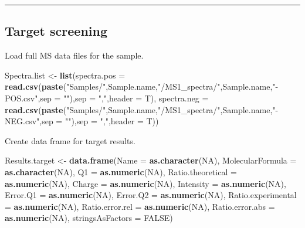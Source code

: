 \documentclass[]{article}
\newenvironment{Shaded}{\begin{snugshade}}{\end{snugshade}}
\newcommand{\KeywordTok}[1]{\textcolor[rgb]{0.13,0.29,0.53}{\textbf{#1}}}
\newcommand{\DataTypeTok}[1]{\textcolor[rgb]{0.13,0.29,0.53}{#1}}
\newcommand{\StringTok}[1]{\textcolor[rgb]{0.31,0.60,0.02}{#1}}
\newcommand{\OtherTok}[1]{\textcolor[rgb]{0.56,0.35,0.01}{#1}}
\newcommand{\NormalTok}[1]{#1}
\begin{document}
\begin{center}\rule{0.5\linewidth}{\linethickness}\end{center}

\subsection{Target screening}\label{target-screening}

Load full MS data files for the sample.

\begin{Shaded}
\begin{Highlighting}[]
\NormalTok{Spectra.list <-}\StringTok{ }\KeywordTok{list}\NormalTok{(}\DataTypeTok{spectra.pos =} \KeywordTok{read.csv}\NormalTok{(}\KeywordTok{paste}\NormalTok{(}\StringTok{"Samples/"}\NormalTok{,Sample.name,}\StringTok{"/MS1_spectra/"}\NormalTok{,Sample.name,}\StringTok{"-POS.csv"}\NormalTok{,}\DataTypeTok{sep =} \StringTok{""}\NormalTok{),}\DataTypeTok{sep =} \StringTok{","}\NormalTok{,}\DataTypeTok{header =}\NormalTok{ T),}
                     \DataTypeTok{spectra.neg =} \KeywordTok{read.csv}\NormalTok{(}\KeywordTok{paste}\NormalTok{(}\StringTok{"Samples/"}\NormalTok{,Sample.name,}\StringTok{"/MS1_spectra/"}\NormalTok{,Sample.name,}\StringTok{"-NEG.csv"}\NormalTok{,}\DataTypeTok{sep =} \StringTok{""}\NormalTok{),}\DataTypeTok{sep =} \StringTok{","}\NormalTok{,}\DataTypeTok{header =}\NormalTok{ T))}
\end{Highlighting}
\end{Shaded}

Create data frame for target results.

\begin{Shaded}
\begin{Highlighting}[]
\NormalTok{Results.target <-}\StringTok{ }\KeywordTok{data.frame}\NormalTok{(}\DataTypeTok{Name =} \KeywordTok{as.character}\NormalTok{(}\OtherTok{NA}\NormalTok{),}
                            \DataTypeTok{MolecularFormula =} \KeywordTok{as.character}\NormalTok{(}\OtherTok{NA}\NormalTok{),}
                            \DataTypeTok{Q1 =} \KeywordTok{as.numeric}\NormalTok{(}\OtherTok{NA}\NormalTok{),}
                            \DataTypeTok{Ratio.theoretical =} \KeywordTok{as.numeric}\NormalTok{(}\OtherTok{NA}\NormalTok{),}
                            \DataTypeTok{Charge =} \KeywordTok{as.numeric}\NormalTok{(}\OtherTok{NA}\NormalTok{),}
                            \DataTypeTok{Intensity =} \KeywordTok{as.numeric}\NormalTok{(}\OtherTok{NA}\NormalTok{),}
                            \DataTypeTok{Error.Q1 =} \KeywordTok{as.numeric}\NormalTok{(}\OtherTok{NA}\NormalTok{),}
                            \DataTypeTok{Error.Q2 =} \KeywordTok{as.numeric}\NormalTok{(}\OtherTok{NA}\NormalTok{),}
                            \DataTypeTok{Ratio.experimental =} \KeywordTok{as.numeric}\NormalTok{(}\OtherTok{NA}\NormalTok{),}
                            \DataTypeTok{Ratio.error.rel =} \KeywordTok{as.numeric}\NormalTok{(}\OtherTok{NA}\NormalTok{),}
                            \DataTypeTok{Ratio.error.abs =} \KeywordTok{as.numeric}\NormalTok{(}\OtherTok{NA}\NormalTok{), }\DataTypeTok{stringsAsFactors =} \OtherTok{FALSE}\NormalTok{)}
\end{Highlighting}
\end{Shaded}
\end{document}
